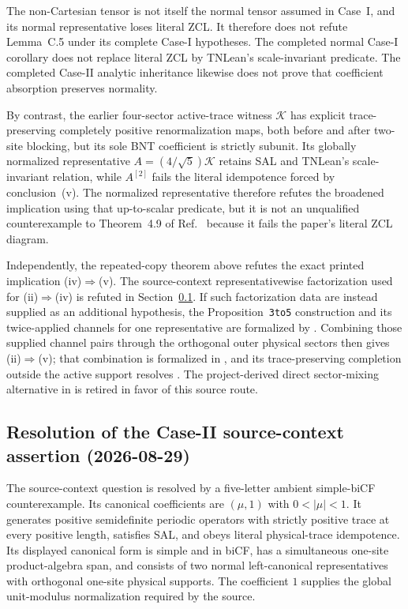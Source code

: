 \documentclass{article}
\begin{document}
The non-Cartesian tensor is not itself the normal tensor assumed in Case~I,
and its normal representative loses literal ZCL. It therefore does not refute
Lemma~C.5 under its complete Case-I hypotheses. The completed normal Case-I
corollary does not replace literal ZCL by TNLean's scale-invariant
 predicate. The completed Case-II analytic
inheritance likewise does not prove that coefficient absorption preserves
normality.

By contrast, the earlier four-sector active-trace witness $\mathcal K$ has
explicit trace-preserving completely positive renormalization maps, both
before and after two-site blocking, but its sole BNT coefficient is strictly
subunit. Its globally normalized representative
$A=(4/\sqrt5)\mathcal K$ retains SAL and TNLean's scale-invariant
 relation, while $A^{[2]}$ fails the literal
idempotence forced by conclusion~(v). The normalized representative therefore
refutes the broadened implication using that up-to-scalar predicate, but it is
not an unqualified counterexample to Theorem~4.9 of
Ref.~\cite{Cirac2016MPDO_arXiv} because it fails the paper's literal ZCL
diagram.

Independently, the repeated-copy theorem above refutes the exact printed
implication (iv)$\Rightarrow$(v). The source-context representativewise
factorization used for (ii)$\Rightarrow$(iv) is refuted in
Section~\ref{sec:cpgsv17_caseii_resolution}. If such factorization data are
instead supplied as an additional hypothesis, the Proposition~\texttt{3to5}
construction and its twice-applied channels for one representative are
formalized by
. Combining those supplied channel pairs through the
orthogonal outer physical sectors then gives (ii)$\Rightarrow$(v); that
combination is formalized in , and its trace-preserving
completion outside the active support resolves . The
project-derived direct sector-mixing alternative in  is retired
in favor of this source route.

\subsection{Resolution of the Case-II source-context assertion (2026-08-29)}
\label{sec:cpgsv17_caseii_resolution}

The source-context question is resolved by a five-letter ambient simple-biCF
counterexample. Its canonical coefficients are $(\mu,1)$ with
$0<|\mu|<1$. It generates positive semidefinite periodic operators with
strictly positive trace at every positive length, satisfies SAL, and obeys
literal physical-trace idempotence. Its displayed canonical form is simple
and in biCF, has a simultaneous one-site product-algebra span, and consists of
two normal left-canonical representatives with orthogonal one-site physical
supports. The coefficient $1$ supplies the global unit-modulus normalization
required by the source.
\end{document}
